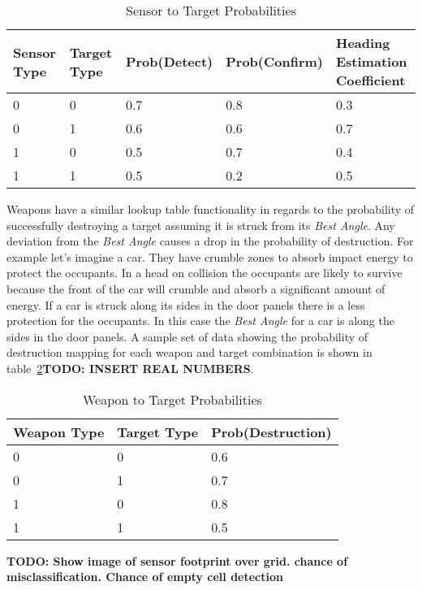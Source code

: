 \begin{table}[H]
	\caption{Sensor to Target Probabilities}
	\centering
	\label{tab:snsrTgtProb}
	\begin{tabular}{|p{1cm}|p{1cm}|p{1cm}|p{1cm}|p{1cm}|}
		\hline
		Sensor Type & Target Type & Prob(Detect) & Prob(Confirm) & Heading Estimation Coefficient\\ \hline
		0 & 0 & 0.7 & 0.8 & 0.3 \\
		0 & 1 & 0.6 & 0.6 & 0.7 \\
		1 & 0 & 0.5 & 0.7 & 0.4 \\
		1 & 1 & 0.5 & 0.2 & 0.5 \\
		\hline
	\end{tabular}
\end{table}

Weapons have a similar lookup table functionality in regards to the probability of successfully destroying a target assuming it is struck from its \textit{Best Angle}.  Any deviation from the \textit{Best Angle} causes a drop in the probability of destruction.  For example let's imagine a car.  They have crumble zones to absorb impact energy to protect the occupants.  In a head on collision the occupants are likely to survive because the front of the car will crumble and absorb a significant amount of energy.  If a car is struck along its sides in the door panels there is a less protection for the occupants.  In this case the \textit{Best Angle} for a car is along the sides in the door panels. A sample set of data showing the probability of destruction mapping for each weapon and target combination is shown in table~\ref{tab:wpnTgtProb}\textbf{TODO: INSERT REAL NUMBERS}.

\begin{table}[H]
	\caption{Weapon to Target Probabilities}
	\centering
	\label{tab:wpnTgtProb}
	\begin{tabular}{|p{1.5cm}|p{1.5cm}|p{3cm}|}
		\hline
		Weapon Type & Target Type & Prob(Destruction)\\ \hline
		0 & 0 & 0.6 \\
		0 & 1 & 0.7 \\
		1 & 0 & 0.8 \\
		1 & 1 & 0.5 \\
		\hline
	\end{tabular}
\end{table}
\textbf{TODO: Show image of sensor footprint over grid. chance of misclassification. Chance of empty cell detection}



